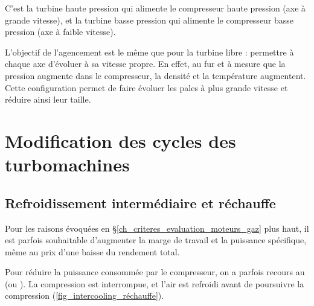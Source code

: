		C’est la turbine haute pression qui alimente le compresseur haute pression (axe à grande vitesse), et la turbine basse pression qui alimente le compresseur basse pression (axe à faible vitesse).

		L’objectif de l’agencement est le même que pour la turbine libre : permettre à chaque axe d’évoluer à sa vitesse propre. En effet, au fur et à mesure que la pression augmente dans le compresseur, la densité et la température augmentent. Cette configuration permet de faire évoluer les pales à plus grande vitesse et réduire ainsi leur taille.




\section{Modification des cycles des turbomachines}


	\subsection{Refroidissement intermédiaire et réchauffe}
	\label{ch_intercooling}

		Pour les raisons évoquées en \S\ref{ch_criteres_evaluation_moteurs_gaz} plus haut, il est parfois souhaitable d’augmenter la marge de travail et la puissance spécifique, même au prix d’une baisse du rendement total.
		
		Pour réduire la puissance consommée par le compresseur, on a parfois recours au  (ou ). La compression est interrompue, et l’air est refroidi avant de poursuivre la compression (\cref{fig_intercooling_réchauffe}).

